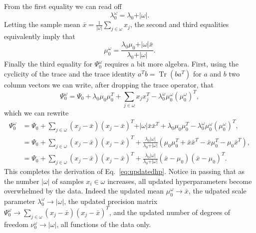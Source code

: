 \documentclass[11pt, oneside]{article}   	%
\DeclareMathOperator{\Tr}{Tr}
\begin{document}
From the first equality we can read off
$$\lambda_0^\omega = \lambda_0 + \vert\omega\vert.$$
Letting the sample mean $\bar x = \frac{1}{\vert\omega\vert}\sum_{j\in\omega}x_j$, the second and third equalities equivalently imply that
$$\mu_0^\omega = \frac{\lambda_0\mu_0 + \vert\omega\vert\bar x}{\lambda_0 + \vert\omega\vert}.$$
Finally the third equality for $\Psi_0^\omega$ requires a bit more algebra. First, using the cyclicity of the trace and the trace identity $a^T b = \Tr(b a^T)$ for $a$ and $b$ two column vectors we can write, after dropping the trace operator, that
\begin{equation}
\Psi_0^\omega = \Psi_0 + \lambda_0\mu_0\mu_0^T + \sum_{j\in\omega} x_j x_j^T - \lambda_0^\omega\mu_0^\omega(\mu_0^\omega)^T,
\end{equation}
which we can rewrite
\begin{equation}\begin{split}
\Psi_0^\omega &= \Psi_0 + \sum_{j\in\omega}(x_j  - \bar x) (x_j - \bar x)^T + \vert\omega\vert\bar x\bar x^T + \lambda_0\mu_0\mu_0^T -\lambda_0^\omega \mu_0^\omega(\mu_0^\omega)^T,\\
&= \Psi_0 + \sum_{j\in\omega}(x_j  - \bar x) (x_j - \bar x)^T + \frac{\lambda_0 \vert\omega\vert}{\lambda_0 + \vert\omega\vert}\left(\mu_0\mu_0^T + \bar x\bar x^T - \bar x\mu_0^T - \mu_0 \bar x^T\right),\\
&= \Psi_0 +  \sum_{j\in\omega}(x_j  - \bar x) (x_j - \bar x)^T + \frac{\lambda_0 \vert\omega\vert}{\lambda_0 + \vert\omega\vert}(\bar x - \mu_0)(\bar x - \mu_0)^T.
\end{split}\end{equation}
This completes the derivation of Eq.~\ref{eq:updatedhp}. Notice in passing that as the number $\vert\omega\vert$ of samples $x_i\in\omega$ increases, all updated hyperparameters become overwhelmed by the data. Indeed the updated mean $\mu_0^\omega \rightarrow \bar x$, the udpated scale parameter $\lambda_0^\omega \rightarrow \vert\omega\vert$, the updated precision matrix $\Psi_0^\omega\rightarrow \sum_{j\in\omega}(x_j - \bar x)(x_j - \bar x)^T$, and the updated number of degrees of freedom $\nu_0^\omega \rightarrow \vert\omega\vert$, all functions of the data only.
\end{document}
